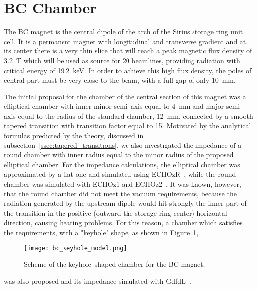 \section{BC Chamber}

    The BC magnet is the central dipole of the arch of the Sirius storage ring unit cell. It is a permanent magnet with longitudinal and transverse gradient and at its center there is a very thin slice that will reach a peak magnetic flux density of \SI{3.2}{\tesla} which will be used as source for 20 beamlines, providing radiation with critical energy of \SI{19.2}{\kilo\electronvolt}. In order to achieve this high flux density, the poles of central part must be very close to the beam, with a full gap of only \SI{10}{\milli\meter}.

    The initial proposal for the chamber of the central section of this magnet was a elliptical chamber with inner minor semi--axis equal to \SI{4}{\milli\meter} and major semi--axis equal to the radius of the standard chamber, \SI{12}{\milli\meter}, connected by a smooth tapered transition with transition factor equal to 15. Motivated by the analytical formulas predicted by the theory, discussed in subsection~\ref{ssec:tapered_transitions}, we also investigated the impedance of a round chamber with inner radius equal to the minor radius of the proposed elliptical chamber. For the impedance calculations, the elliptical chamber was approximated by a flat one and simulated using ECHOzR~\cite{Zagorodnov2015}, while the round chamber was simulated with ECHOz1 and ECHOz2~\cite{Zagorodnov2005}. It was known, however, that the round chamber did not meet the vacuum requirements, because the radiation generated by the upstream dipole would hit strongly the inner part of the transition in the positive (outward the storage ring center) horizontal direction, causing heating problems. For this reason, a chamber which satisfies the requirements, with a "keyhole" shape, as shown in Figure~\ref{fig:bc_keyhole_model},
    \begin{figure}[b]
        \centering
        \texttt{[image: bc\_keyhole\_model.png]}
        \caption{Scheme of the keyhole--shaped chamber for the BC magnet.}
        \label{fig:bc_keyhole_model}
    \end{figure}
    was also proposed and its impedance simulated with GdfdL~\cite{Bruns2017}.

